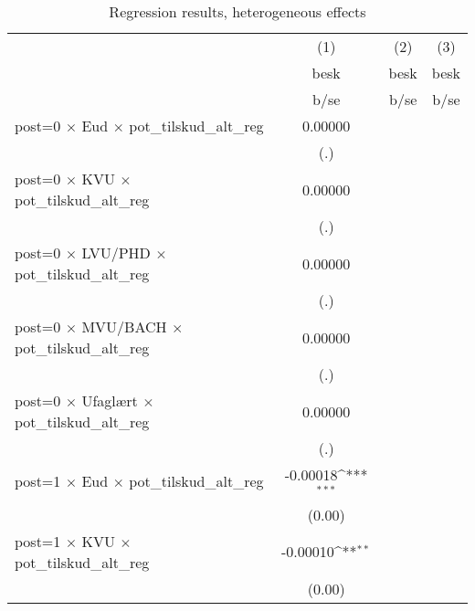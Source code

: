 \begin{table}[htbp]\centering
\def\sym#1{\ifmmode^{#1}\else\(^{#1}\)\fi}
\caption{Regression results, heterogeneous effects}
\begin{tabular}{l*{3}{c}}
\hline\hline
                    &\multicolumn{1}{c}{(1)}&\multicolumn{1}{c}{(2)}&\multicolumn{1}{c}{(3)}\\
                    &\multicolumn{1}{c}{besk}&\multicolumn{1}{c}{besk}&\multicolumn{1}{c}{besk}\\
                    &        b/se         &        b/se         &        b/se         \\
\hline
post=0 $\times$ Eud $\times$ pot\_tilskud\_alt\_reg&     0.00000         &                     &                     \\
                    &         (.)         &                     &                     \\
post=0 $\times$ KVU $\times$ pot\_tilskud\_alt\_reg&     0.00000         &                     &                     \\
                    &         (.)         &                     &                     \\
post=0 $\times$ LVU/PHD $\times$ pot\_tilskud\_alt\_reg&     0.00000         &                     &                     \\
                    &         (.)         &                     &                     \\
post=0 $\times$ MVU/BACH $\times$ pot\_tilskud\_alt\_reg&     0.00000         &                     &                     \\
                    &         (.)         &                     &                     \\
post=0 $\times$ Ufaglært $\times$ pot\_tilskud\_alt\_reg&     0.00000         &                     &                     \\
                    &         (.)         &                     &                     \\
post=1 $\times$ Eud $\times$ pot\_tilskud\_alt\_reg&    -0.00018\sym{***}&                     &                     \\
                    &      (0.00)         &                     &                     \\
post=1 $\times$ KVU $\times$ pot\_tilskud\_alt\_reg&    -0.00010\sym{**} &                     &                     \\
                    &      (0.00)         &                     &                     \\

\end{tabular}
\end{table}

